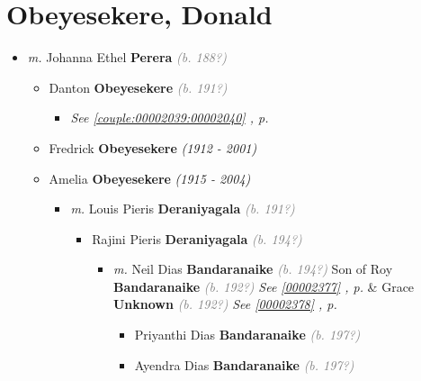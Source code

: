 \documentclass[10pt, openany]{book}
\begin{document}
\chapter{Obeyesekere, Donald}
\label{00002037}
\textcolor{slmaroon}{\textit{}}
\begin{itemize}
\item{\textit{m.} Johanna Ethel \textbf{Perera} \textcolor{gray}{\textit{(b. 188?)}}   \label{couple:00002037:00002038} \begin{itemize}
\item{Danton \textbf{Obeyesekere} \textcolor{gray}{\textit{(b. 191?)}}
\begin{itemize}
\item{\textcolor{slteal}{\textit{See  \autoref{couple:00002039:00002040} \textit{, p. \pageref{couple:00002039:00002040} }}}}
\end{itemize}
 }
\item{Fredrick \textbf{Obeyesekere} \textcolor{slorange}{\textit{(1912 - 2001)}}
 }
\item{Amelia \textbf{Obeyesekere} \textcolor{slorange}{\textit{(1915 - 2004)}}
\begin{itemize}
\item{\textit{m.} Louis Pieris \textbf{Deraniyagala} \textcolor{gray}{\textit{(b. 191?)}}   \label{couple:00002072:00002073} \begin{itemize}
\item{Rajini Pieris \textbf{Deraniyagala} \textcolor{gray}{\textit{(b. 194?)}}
\begin{itemize}
\item{\textit{m.} Neil Dias \textbf{Bandaranaike} \textcolor{gray}{\textit{(b. 194?)}} Son of  Roy \textbf{Bandaranaike} \textcolor{gray}{\textit{(b. 192?)}} \textcolor{slteal}{\textit{See  \autoref{00002377} \textit{, p. \pageref{00002377} }}}  \&  Grace \textbf{Unknown} \textcolor{gray}{\textit{(b. 192?)}} \textcolor{slteal}{\textit{See  \autoref{00002378} \textit{, p. \pageref{00002378} }}}   \label{couple:00002077:00002078} \begin{itemize}
\item{Priyanthi Dias \textbf{Bandaranaike} \textcolor{gray}{\textit{(b. 197?)}}
  }
\item{Ayendra Dias \textbf{Bandaranaike} \textcolor{gray}{\textit{(b. 197?)}}
  }
\end{itemize}}
\end{itemize}
}
\end{itemize}}
\end{itemize}}
\end{itemize}}
\end{itemize}
\end{document}
